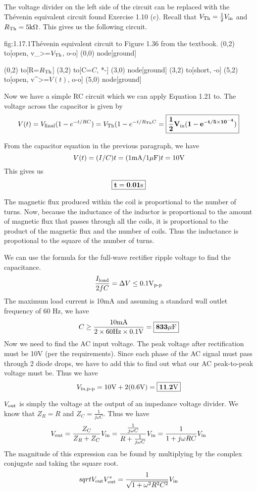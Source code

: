\documentclass{article}
\begin{document}
    The voltage divider on the left side of the circuit can be replaced with the Th\'evenin equivalent circuit found Exercise 1.10 (c). Recall that $V_{\text{Th}} = \frac{1}{2} V_{\text{in}}$ and $R_{\text{Th}} = 5\text{k}\Omega$. This gives us the following circuit.
    \begin{circuit}{fig:1.17.1}{Th\'evenin equivalent circuit to Figure 1.36 from the textbook.}
        (0,2) to[open, v_>=$V_{\text{Th}}$, o-o] (0,0) node[ground]{}
        
        (0,2) to[R=$R_{\text{Th}}$] (3,2)
            to[C=$C$, *-] (3,0) node[ground]{}
        (3,2) to[short, -o] (5,2)
        to[open, v^>=$V(t)$, o-o] (5,0) node[ground]{}
    \end{circuit}

    Now we have a simple RC circuit which we can apply Equation 1.21 to. The voltage across the capacitor is given by 
    \[V(t) = V_\text{final}(1 - e^{-t/RC}) = V_{\text{Th}} (1 - e^{-t/R_{\text{Th}} C} = \boxed{\mathbf{\frac{1}{2}V_{\text{in}} (1 - e^{-t/5 \times 10^{-4}})}}\]


    From the capacitor equation in the previous paragraph, we have 
    \[V(t) = (I/C)t = (1 \text{m}\text{A}/1\mu\text{F})t = 10\text{V}\]
    This gives us
    \[\boxed{\mathbf{t = 0.01\text{s}}}\]

    The magnetic flux produced within the coil is proportional to the number of turns. Now, because the inductance of the inductor is proportional to the amount of magnetic flux that passes through all the coils, it is proportional to the product of the magnetic flux and the number of coils. Thus the inductance is propotional to the square of the number of turns.

    We can use the formula for the full-wave rectifier ripple voltage to find the capacitance.
    \[\frac{I_{\text{load}}}{2fC} = \Delta V \le 0.1 \text{V}_{\text{p-p}}\]
    The maximum load current is 10mA and assuming a standard wall outlet frequency of 60 Hz, we have
    \[C \ge \frac{10\text{m}\text{A}}{2\times 60\text{Hz} \times 0.1\text{V}} = \boxed{\mathbf{833 \mu\text{F}}}\]
    Now we need to find the AC input voltage. The peak voltage after rectification must be 10V (per the requirements). Since each phase of the AC signal must pass through 2 diode drops, we have to add this to find out what our AC peak-to-peak voltage must be. Thus we have
    \[V_{\text{in}, \text{p-p}} = 10\text{V} + 2(0.6\text{V}) = \boxed{\mathbf{11.2\text{V}}}\]

    $V_{\text{out}}$ is simply the voltage at the output of an impedance voltage divider. We know that $Z_R = R$ and $Z_C = \frac{1}{j\omega C}$. Thus we have 
    \[V_{\text{out}} = \frac{Z_C}{Z_R + Z_C} V_{\text{in}} = \frac{\frac{1}{j \omega C}}{R + \frac{1}{j \omega C}} V_{\text{in}} = \frac{1}{1 + j \omega R C} V_{\text{in}}\]
    The magnitude of this expression can be found by multiplying by the complex conjugate and taking the square root.
    \[sqrt{V_{\text{out}} V_{\text{out}}^*} = \frac{1}{\sqrt{1 + \omega^2R^2C^2}}V_{\text{in}}\]
    
\end{document}
